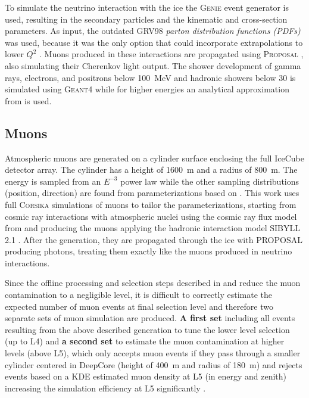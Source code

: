 To simulate the neutrino interaction with the ice the \textsc{Genie} event generator  is used, resulting in the secondary particles and the kinematic and cross-section parameters. As input, the outdated GRV98  \textit{parton distribution functions (PDFs)} was used, because it was the only option that could incorporate extrapolations to lower $Q^2$ . Muons produced in these interactions are propagated using \textsc{Proposal} , also simulating their Cherenkov light output. The shower development of gamma rays, electrons, and positrons below \SI{100}{\mega\electronvolt} and hadronic showers below \SI{30}{\gev} is simulated using \textsc{Geant4}  while for higher energies an analytical approximation from  is used.


\subsection{Muons}

Atmospheric muons are generated on a cylinder surface enclosing the full IceCube detector array. The cylinder has a height of \SI{1600}{\meter} and a radius of \SI{800}{\meter}. The energy is sampled from an $E^{-3}$ power law while the other sampling distributions (position, direction) are found from parameterizations based on . This work uses full \textsc{Corsika}  simulations of muons to tailor the parameterizations, starting from cosmic ray interactions with atmospheric nuclei using the cosmic ray flux model from  and producing the muons applying the hadronic interaction model SIBYLL 2.1 . After the generation, they are propagated through the ice with PROPOSAL producing photons, treating them exactly like the muons produced in neutrino interactions.

Since the offline processing and selection steps described in  and  reduce the muon contamination to a negligible level, it is difficult to correctly estimate the expected number of muon events at final selection level and therefore two separate sets of muon simulation are produced. \textbf{A first set} including all events resulting from the above described generation to tune the lower level selection (up to L4) and \textbf{a second set} to estimate the muon contamination at higher levels (above L5), which only accepts muon events if they pass through a smaller cylinder centered in DeepCore (height of \SI{400}{\meter} and radius of \SI{180}{\meter}) and rejects events based on a KDE estimated muon density at L5 (in energy and zenith) increasing the simulation efficiency at L5 significantly .


